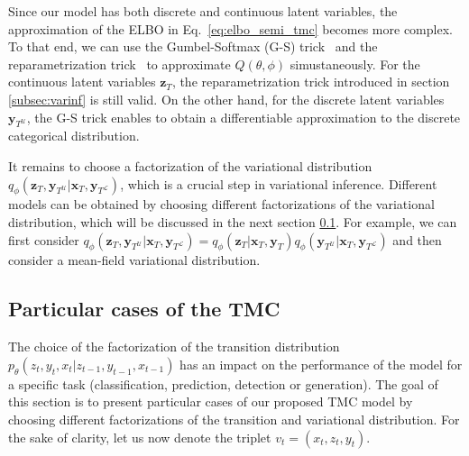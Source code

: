 \documentclass{article}
\def\x{{\mathbf x}}
\def\z{{\mathbf z}}
\def\y{{\mathbf y}}
\def\yl{{\mathbf y}_{T^{\mathcal{L}}}}
\def\yu{{\mathbf y}_{T^{\mathcal{U}}}}
\def\p{p_{\theta}}
\def\q{q_\phi}
\newcommand{\katy}[1]{\todo[size=\tiny,color=pink]{#1  \hfill --- Kat}}
\begin{document}
Since our model has both discrete and continuous latent variables, 
the approximation of the ELBO in Eq.~\eqref{eq:elbo_semi_tmc} becomes more complex.
To that end,  we can use the Gumbel-Softmax (G-S) 
trick~\cite{maddison2016concrete, jang2016categorical} and the reparametrization
trick~\cite{kingma2013auto} to approximate $Q(\theta,\phi)$ simustaneously.
For the continuous latent variables $\z_T$, the reparametrization 
trick introduced in section \ref{subsec:varinf} is still valid.
On the other hand, for the discrete latent variables $\yu$, 
the G-S trick enables to obtain a differentiable approximation to the discrete
categorical distribution. 

It remains to choose a factorization of the variational distribution
$\q(\z_T, \yu| \x_T, \yl)$, which is a crucial step in variational inference.
Different models can be obtained by choosing different factorizations 
of the variational distribution, which will be discussed 
in the next section \ref{subsec:particular_cases}. For example, we can first consider  
$\q(\z_T, \yu| \x_T, \yl) =  \q(\z_T| \x_T, \y_T ) \q(\yu| \x_T, \yl )$ 
and then consider a mean-field variational distribution.






\subsection{Particular cases of the TMC}
\label{subsec:particular_cases}
The choice of the factorization of the transition distribution 
$\p(z_t, y_t, x_t|z_{t-1},y_{t-1}, x_{t-1})$  has an impact on the
performance of the model for a specific task (classification, prediction,
detection or generation). 
The goal of this section is to present particular cases of our proposed TMC model
by choosing different factorizations of the transition and 
variational distribution.
For the sake of clarity, let us now denote the triplet $v_t=(x_t,z_t,y_t)$.
\end{document}
